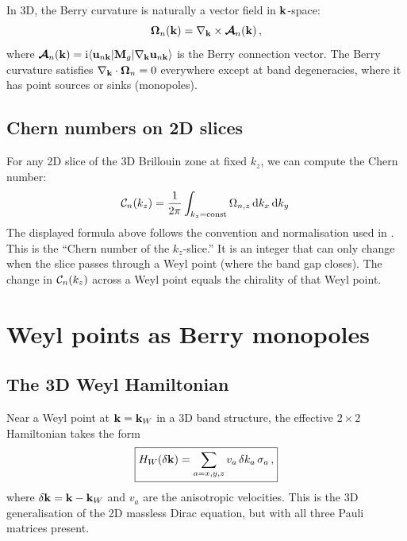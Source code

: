 In 3D, the Berry curvature is naturally a vector field in
$\mathbf{k}$-space:
\begin{equation}\label{eq:ch15-berry-3d}
  \boldsymbol{\Omega}_n(\mathbf{k})
  = \nabla_{\mathbf{k}}\times\boldsymbol{\mathcal{A}}_n(\mathbf{k})\,,
\end{equation}
where $\boldsymbol{\mathcal{A}}_n(\mathbf{k})=\mathrm{i}\langle\mathbf{u}_{n\mathbf{k}}|\mathbf{M}_g
|\nabla_{\mathbf{k}}\mathbf{u}_{n\mathbf{k}}\rangle$ is the Berry connection
vector.  The Berry curvature satisfies
$\nabla_{\mathbf{k}}\cdot\boldsymbol{\Omega}_n=0$ everywhere except at band
degeneracies, where it has point sources or sinks (monopoles).

\subsection{Chern numbers on 2D slices}
\label{sec:ch15-slices}

For any 2D slice of the 3D Brillouin zone at fixed $k_z$, we can
compute the Chern number:
\begin{equation}\label{eq:ch15-slice-chern}
  \mathcal{C}_n(k_z) = \frac{1}{2\pi}\int_{k_z=\mathrm{const}}
  \Omega_{n,z}\,\mathrm{d} k_x\,\mathrm{d} k_y\,
\end{equation}
The displayed formula above follows the convention and normalisation used in \cite{zhao2020first}.
This is the ``Chern number of the $k_z$-slice.''  It is an integer that
can only change when the slice passes through a Weyl point (where the
band gap closes).  The change in $\mathcal{C}_n(k_z)$ across a Weyl point
equals the chirality of that Weyl point.

\section{Weyl points as Berry monopoles}
\label{sec:ch15-monopoles}

\subsection{The 3D Weyl Hamiltonian}
\label{sec:ch15-weyl-hamiltonian}

Near a Weyl point at $\mathbf{k}=\mathbf{k}_W$ in a 3D band structure, the
effective $2\times 2$ Hamiltonian takes the form
\begin{equation}\label{eq:ch15-weyl-hamiltonian}
  \boxed{%
  H_W(\delta\kvec) = \sum_{a=x,y,z} v_a\,\delta k_a\,\sigma_a\,,}
\end{equation}
where $\delta\mathbf{k}=\mathbf{k}-\mathbf{k}_W$ and $v_a$ are the anisotropic
velocities.  This is the 3D generalisation of the 2D massless Dirac
equation, but with all three Pauli matrices present.

